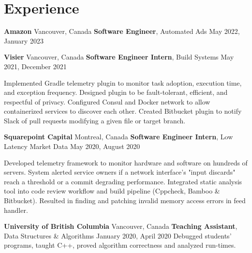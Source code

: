 \section{Experience}

\outerlist
{
    \entrybig
    {
        \textbf{Amazon}
    }
    {
        Vancouver, Canada
    }
    {
        \textbf{Software Engineer}, Automated Ads
    }
    {
        May 2022, January 2023
    }

    \entrybig
	{
	    \textbf{Visier}
    }
    {
        Vancouver, Canada
    }
	{
	    \textbf{Software Engineer Intern}, Build Systems
    }
    {
        May 2021, December 2021
    }
    
    \innerlist
    {
        \entry
        {
            Implemented Gradle telemetry plugin to monitor task adoption, execution time, and exception frequency. Designed plugin to be fault-tolerant, efficient, and respectful of privacy.
        }
        \entry
        {
            Configured Consul and Docker network to allow containerized services to discover each other.
        }
        \entry
        {
            Created Bitbucket plugin to notify Slack of pull requests modifying a given file or target branch.
        }
    }
    
    \entrybig
	{
	    \textbf{Squarepoint Capital}
    }
    {
        Montreal, Canada
    }
	{
	    \textbf{Software Engineer Intern}, Low Latency Market Data
    }
    {
        May 2020, August 2020
    }
    
    \innerlist
    {
	    \entry
        {
            Developed telemetry framework to monitor hardware and software on hundreds of servers. System alerted service owners if a network interface's "input discards" reach a threshold or a commit degrading performance.
        }
	    \entry
	    {
            Integrated static analysis tool into code review workflow and build pipeline (Cppcheck, Bamboo \& Bitbucket). Resulted in finding and patching invalid memory access errors in feed handler.
        }
    }

    \entrybig
	{
        \textbf{University of British Columbia}
    }
    {
        Vancouver, Canada
    }
	{
        \textbf{Teaching Assistant}, Data Structures \& Algorithms
    }
    {
        January 2020, April 2020
    }
    \innerlist
    {
        \entry
        {
            Debugged students’ programs, taught C++, proved algorithm correctness and analyzed run-times.
        }
    }
}
